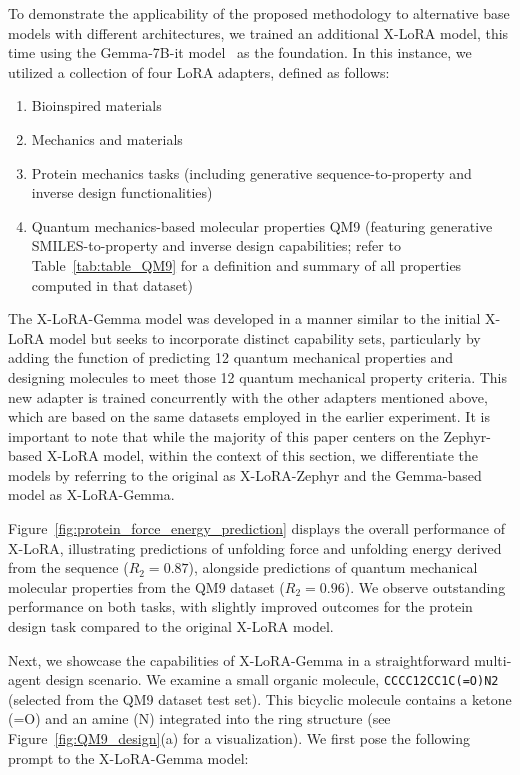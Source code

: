 To demonstrate the applicability of the proposed methodology to alternative base models with different architectures, we trained an additional X-LoRA model, this time using the Gemma-7B-it model~\cite{Google/gemma-7b-itFace} as the foundation. In this instance, we utilized a collection of four LoRA adapters, defined as follows:

\begin{enumerate}
    \item Bioinspired materials \item Mechanics and materials \item Protein mechanics tasks (including generative sequence-to-property and inverse design functionalities) \item Quantum mechanics-based molecular properties QM9 (featuring generative SMILES-to-property and inverse design capabilities; refer to Table~\ref{tab:table_QM9} for a definition and summary of all properties computed in that dataset)~\cite{Ruddigkeit2012EnumerationGDB-17,Ramakrishnan2015ElectronicSpace}
\end{enumerate}

The X-LoRA-Gemma model was developed in a manner similar to the initial X-LoRA model but seeks to incorporate distinct capability sets, particularly by adding the function of predicting 12 quantum mechanical properties and designing molecules to meet those 12 quantum mechanical property criteria. This new adapter is trained concurrently with the other adapters mentioned above, which are based on the same datasets employed in the earlier experiment. It is important to note that while the majority of this paper centers on the Zephyr-based X-LoRA model, within the context of this section, we differentiate the models by referring to the original as X-LoRA-Zephyr and the Gemma-based model as X-LoRA-Gemma.

Figure~\ref{fig:protein_force_energy_prediction} displays the overall performance of X-LoRA, illustrating predictions of unfolding force and unfolding energy derived from the sequence ($R_2 = 0.87$), alongside predictions of quantum mechanical molecular properties from the QM9 dataset ($R_2 = 0.96$). We observe outstanding performance on both tasks, with slightly improved outcomes for the protein design task compared to the original X-LoRA model.

Next, we showcase the capabilities of X-LoRA-Gemma in a straightforward multi-agent design scenario. We examine a small organic molecule, \texttt{CCCC12CC1C(=O)N2} (selected from the QM9 dataset test set). This bicyclic molecule contains a ketone (=O) and an amine (N) integrated into the ring structure (see Figure~\ref{fig:QM9_design}(a) for a visualization). We first pose the following prompt to the X-LoRA-Gemma model:


